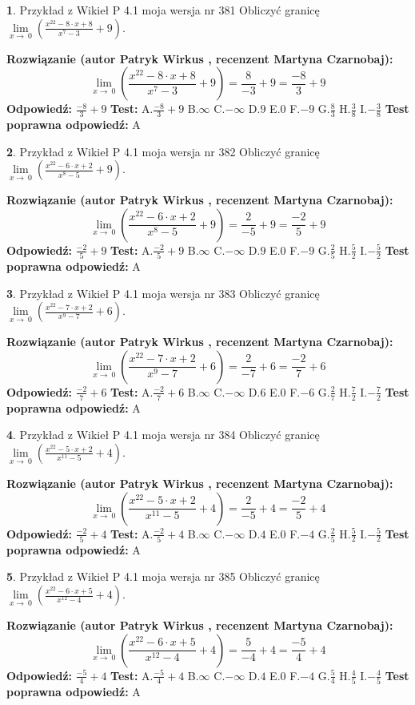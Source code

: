 \documentclass[12pt, a4paper]{article}
\theoremstyle{definition} %
\newtheorem{zad}{}
\newcommand{\zadStart}[1]{\begin{zad}#1\newline}
\newcommand{\zadStop}{\end{zad}}
\newcommand{\rozwStart}[2]{\noindent \textbf{Rozwiązanie (autor #1 , recenzent #2): }\newline}
\newcommand{\rozwStop}{\newline}
\newcommand{\odpStart}{\noindent \textbf{Odpowiedź:}\newline}
\newcommand{\odpStop}{\newline}
\newcommand{\testStart}{\noindent \textbf{Test:}\newline}
\newcommand{\testStop}{\newline}
\newcommand{\kluczStart}{\noindent \textbf{Test poprawna odpowiedź:}\newline}
\newcommand{\kluczStop}{\newline}
\begin{document}
\zadStart{Przykład z Wikieł P 4.1 moja wersja nr 381}
Obliczyć granicę $\lim\limits_{x\to\ 0}(\frac{x^{22}-8 \cdot x +8}{x^{7}-3}+9)$.
\zadStop
\rozwStart{Patryk Wirkus}{Martyna Czarnobaj}
$$\lim\limits_{x\to\ 0}(\frac{x^{22}-8 \cdot x +8}{x^{7}-3}+9)=\frac{8}{-3}+9=\frac{-8}{3}+9$$
\rozwStop
\odpStart
$\frac{-8}{3}+9$
\odpStop
\testStart
A.$\frac{-8}{3}+9$
B.$\infty$
C.$-\infty$
D.$9$
E.$0$
F.$-9$
G.$\frac{8}{3}$
H.$\frac{3}{8}$
I.$-\frac{3}{8}$
\testStop
\kluczStart
A
\kluczStop



\zadStart{Przykład z Wikieł P 4.1 moja wersja nr 382}
Obliczyć granicę $\lim\limits_{x\to\ 0}(\frac{x^{22}-6 \cdot x +2}{x^{8}-5}+9)$.
\zadStop
\rozwStart{Patryk Wirkus}{Martyna Czarnobaj}
$$\lim\limits_{x\to\ 0}(\frac{x^{22}-6 \cdot x +2}{x^{8}-5}+9)=\frac{2}{-5}+9=\frac{-2}{5}+9$$
\rozwStop
\odpStart
$\frac{-2}{5}+9$
\odpStop
\testStart
A.$\frac{-2}{5}+9$
B.$\infty$
C.$-\infty$
D.$9$
E.$0$
F.$-9$
G.$\frac{2}{5}$
H.$\frac{5}{2}$
I.$-\frac{5}{2}$
\testStop
\kluczStart
A
\kluczStop



\zadStart{Przykład z Wikieł P 4.1 moja wersja nr 383}
Obliczyć granicę $\lim\limits_{x\to\ 0}(\frac{x^{22}-7 \cdot x +2}{x^{9}-7}+6)$.
\zadStop
\rozwStart{Patryk Wirkus}{Martyna Czarnobaj}
$$\lim\limits_{x\to\ 0}(\frac{x^{22}-7 \cdot x +2}{x^{9}-7}+6)=\frac{2}{-7}+6=\frac{-2}{7}+6$$
\rozwStop
\odpStart
$\frac{-2}{7}+6$
\odpStop
\testStart
A.$\frac{-2}{7}+6$
B.$\infty$
C.$-\infty$
D.$6$
E.$0$
F.$-6$
G.$\frac{2}{7}$
H.$\frac{7}{2}$
I.$-\frac{7}{2}$
\testStop
\kluczStart
A
\kluczStop



\zadStart{Przykład z Wikieł P 4.1 moja wersja nr 384}
Obliczyć granicę $\lim\limits_{x\to\ 0}(\frac{x^{22}-5 \cdot x +2}{x^{11}-5}+4)$.
\zadStop
\rozwStart{Patryk Wirkus}{Martyna Czarnobaj}
$$\lim\limits_{x\to\ 0}(\frac{x^{22}-5 \cdot x +2}{x^{11}-5}+4)=\frac{2}{-5}+4=\frac{-2}{5}+4$$
\rozwStop
\odpStart
$\frac{-2}{5}+4$
\odpStop
\testStart
A.$\frac{-2}{5}+4$
B.$\infty$
C.$-\infty$
D.$4$
E.$0$
F.$-4$
G.$\frac{2}{5}$
H.$\frac{5}{2}$
I.$-\frac{5}{2}$
\testStop
\kluczStart
A
\kluczStop



\zadStart{Przykład z Wikieł P 4.1 moja wersja nr 385}
Obliczyć granicę $\lim\limits_{x\to\ 0}(\frac{x^{22}-6 \cdot x +5}{x^{12}-4}+4)$.
\zadStop
\rozwStart{Patryk Wirkus}{Martyna Czarnobaj}
$$\lim\limits_{x\to\ 0}(\frac{x^{22}-6 \cdot x +5}{x^{12}-4}+4)=\frac{5}{-4}+4=\frac{-5}{4}+4$$
\rozwStop
\odpStart
$\frac{-5}{4}+4$
\odpStop
\testStart
A.$\frac{-5}{4}+4$
B.$\infty$
C.$-\infty$
D.$4$
E.$0$
F.$-4$
G.$\frac{5}{4}$
H.$\frac{4}{5}$
I.$-\frac{4}{5}$
\testStop
\kluczStart
A
\kluczStop
\end{document}
